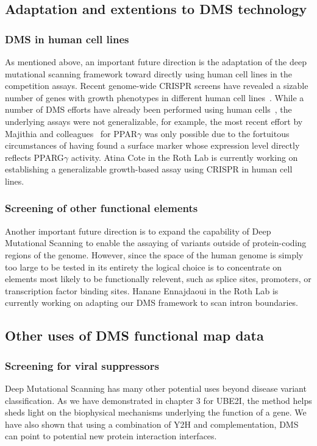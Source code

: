 \subsection{Adaptation and extentions to DMS technology}
\subsubsection{DMS in human cell lines}
As mentioned above, an important future direction is the adaptation of the deep mutational scanning framework toward directly using human cell lines in the competition assays. Recent genome-wide CRISPR screens have revealed a sizable number of genes with growth phenotypes in different human cell lines~\cite{hart_high-resolution_2015,blomen_gene_2015,wang_genetic_2014}. While a number of DMS efforts have already been performed using human cells~\cite{forsyth_deep_2013,wagenaar_resistance_2014,doud_site-specific_2015,majithia_prospective_2016}, the underlying assays were not generalizable, for example, the most recent effort by Majithia and colleagues~\cite{majithia_prospective_2016} for PPAR$\gamma$ was only possible due to the fortuitous circumstances of having found a surface marker whose expression level directly reflects PPARG$\gamma$ activity. 
Atina Cote in the Roth Lab is currently working on establishing a generalizable growth-based assay using CRISPR in human cell lines. 

\subsubsection{Screening of other functional elements}
Another important future direction is to expand the capability of Deep Mutational Scanning to enable the assaying of variants outside of protein-coding regions of the genome. However, since the space of the human genome is simply too large to be tested in its entirety the logical choice is to concentrate on elements most likely to be functionally relevent, such as splice sites, promoters, or transcription factor binding sites.
Hanane Ennajdaoui in the Roth Lab is currently working on adapting our DMS framework to scan intron boundaries.

\subsection{Other uses of DMS functional map data}

\subsubsection{Screening for viral suppressors}
Deep Mutational Scanning has many other potential uses beyond disease variant classification. As we have demonstrated in chapter 3 for UBE2I, the method helps sheds light on the biophysical mechanisms underlying the function of a gene. We have also shown that using a combination of Y2H and complementation, DMS can point to potential new protein interaction interfaces. 

